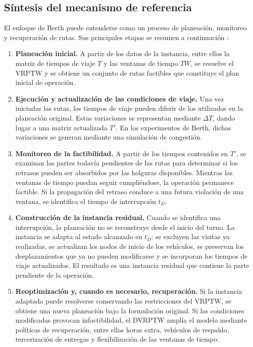 \documentclass[11pt]{article}
\begin{document}
\subsection{Síntesis del mecanismo de referencia}

El enfoque de Berth puede entenderse como un proceso de planeación, monitoreo y
recuperación de rutas. Sus principales etapas se resumen a continuación
\parencite{berth_thesis_2025}:

\begin{enumerate}
    \item \textbf{Planeación inicial.}
    A partir de los datos de la instancia, entre ellos la matriz de tiempos de viaje
    \(T\) y las ventanas de tiempo \(TW\), se resuelve el VRPTW y se obtiene un
    conjunto de rutas factibles que constituye el plan inicial de operación.

    \item \textbf{Ejecución y actualización de las condiciones de viaje.}
    Una vez iniciadas las rutas, los tiempos de viaje pueden diferir de los utilizados
    en la planeación original. Estas variaciones se representan mediante
    \(\Delta T\), dando lugar a una matriz actualizada \(T'\). En los experimentos
    de Berth, dichas variaciones se generan mediante una simulación de congestión.

    \item \textbf{Monitoreo de la factibilidad.}
    A partir de los tiempos contenidos en \(T'\), se examinan las partes todavía
    pendientes de las rutas para determinar si los retrasos pueden ser absorbidos por
    las holguras disponibles. Mientras las ventanas de tiempo puedan seguir
    cumpliéndose, la operación permanece factible. Si la propagación del retraso
    conduce a una futura violación de una ventana, se identifica el tiempo de
    interrupción \(t_D\).

    \item \textbf{Construcción de la instancia residual.}
    Cuando se identifica una interrupción, la planeación no se reconstruye desde el
    inicio del turno. La instancia se adapta al estado alcanzado en \(t_D\): se
    excluyen las visitas ya realizadas, se actualizan los nodos de inicio de los
    vehículos, se preservan los desplazamientos que ya no pueden modificarse y se
    incorporan los tiempos de viaje actualizados. El resultado es una instancia
    residual que contiene la parte pendiente de la operación.

    \item \textbf{Reoptimización y, cuando es necesario, recuperación.}
    Si la instancia adaptada puede resolverse conservando las restricciones del VRPTW,
    se obtiene una nueva planeación bajo la formulación original. Si las condiciones
    modificadas provocan infactibilidad, el DVRPTW amplía el modelo mediante
    políticas de recuperación, entre ellas horas extra, vehículos de respaldo,
    tercerización de entregas y flexibilización de las ventanas de tiempo.
\end{enumerate}
\end{document}
